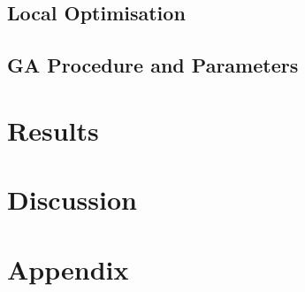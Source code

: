 \documentclass{article}
\begin{document}
\subsection{Local Optimisation}



\subsection{GA Procedure and Parameters}

\section{Results}

\section{Discussion}

\section{Appendix}


	

\pagebreak

\printbibliography
\end{document}
